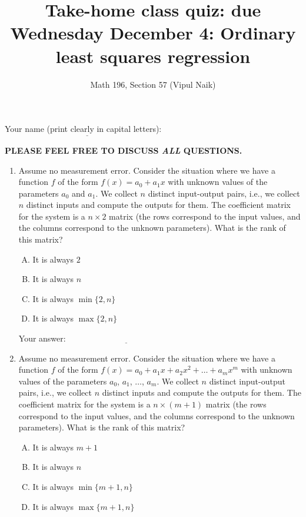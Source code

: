 \documentclass[10pt]{amsart}
\title{Take-home class quiz: due Wednesday December 4: Ordinary least squares regression}
\author{Math 196, Section 57 (Vipul Naik)}
\begin{document}
\maketitle

Your name (print clearly in capital letters): $\underline{\qquad\qquad\qquad\qquad\qquad\qquad\qquad\qquad\qquad\qquad}$

{\bf PLEASE FEEL FREE TO DISCUSS {\em ALL} QUESTIONS.}

\begin{enumerate}

\item Assume no measurement error. Consider the situation where we
  have a function $f$ of the form $f(x) =a_0 + a_1x$ with unknown
  values of the parameters $a_0$ and $a_1$. We collect $n$ distinct
  input-output pairs, i.e., we collect $n$ distinct inputs and compute
  the outputs for them. The coefficient matrix for the system is a $n
  \times 2$ matrix (the rows correspond to the input values, and the
  columns correspond to the unknown parameters). What is the rank of
  this matrix?

  \begin{enumerate}[(A)]
  \item It is always $2$
  \item It is always $n$
  \item It is always $\min \{ 2, n \}$
  \item It is always $\max \{ 2, n \}$
  \end{enumerate}

  \vspace{0.1in}
  Your answer: $\underline{\qquad\qquad\qquad\qquad\qquad\qquad\qquad}$
  \vspace{0.1in}

\item Assume no measurement error. Consider the situation where we
  have a function $f$ of the form $f(x) =a_0 + a_1x + a_2x^2 + \dots +
  a_mx^m$ with unknown values of the parameters $a_0$, $a_1$, $\dots$,
  $a_m$. We collect $n$ distinct input-output pairs, i.e., we collect
  $n$ distinct inputs and compute the outputs for them. The
  coefficient matrix for the system is a $n \times (m + 1)$ matrix
  (the rows correspond to the input values, and the columns correspond
  to the unknown parameters). What is the rank of this matrix?

  \begin{enumerate}[(A)]
  \item It is always $m + 1$
  \item It is always $n$
  \item It is always $\min \{ m + 1, n \}$
  \item It is always $\max \{ m + 1, n \}$
  \end{enumerate}


\end{enumerate}
\end{document}
